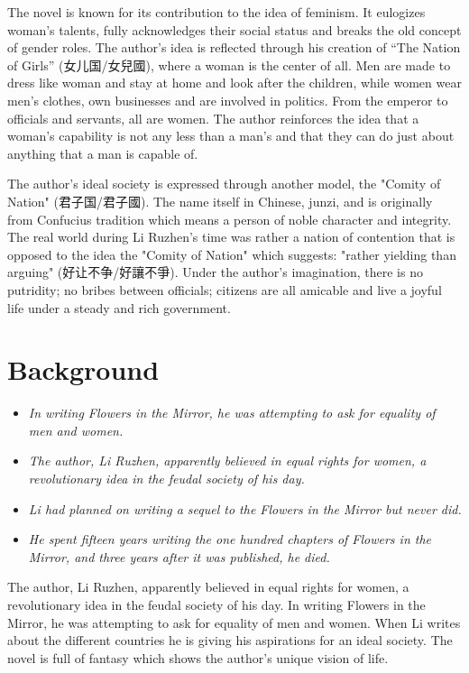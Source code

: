 The novel is known for its contribution to the idea of feminism. It
eulogizes woman's talents, fully acknowledges their social status and
breaks the old concept of gender roles. The author's idea is reflected
through his creation of ``The Nation of Girls'' (女儿国/女兒國), where a
woman is the center of all. Men are made to dress like woman and stay at
home and look after the children, while women wear men's clothes, own
businesses and are involved in politics. From the emperor to officials
and servants, all are women. The author reinforces the idea that a
woman's capability is not any less than a man's and that they can do
just about anything that a man is capable of.

The author's ideal society is expressed through another model, the
"Comity of Nation" (君子国/君子國). The name itself in Chinese, junzi,
and is originally from Confucius tradition which means a person of noble
character and integrity. The real world during Li Ruzhen's time was
rather a nation of contention that is opposed to the idea the "Comity of
Nation" which suggests: "rather yielding than arguing"
(好让不争/好讓不爭). Under the author's imagination, there is no
putridity; no bribes between officials; citizens are all amicable and
live a joyful life under a steady and rich government.

\section{Background}\label{background}

\begin{itemize}
\item
  \emph{In writing Flowers in the Mirror, he was attempting to ask for
  equality of men and women.}
\item
  \emph{The author, Li Ruzhen, apparently believed in equal rights for
  women, a revolutionary idea in the feudal society of his day.}
\item
  \emph{Li had planned on writing a sequel to the Flowers in the Mirror
  but never did.}
\item
  \emph{He spent fifteen years writing the one hundred chapters of
  Flowers in the Mirror, and three years after it was published, he
  died.}
\end{itemize}

The author, Li Ruzhen, apparently believed in equal rights for women, a
revolutionary idea in the feudal society of his day. In writing Flowers
in the Mirror, he was attempting to ask for equality of men and women.
When Li writes about the different countries he is giving his
aspirations for an ideal society. The novel is full of fantasy which
shows the author's unique vision of life.


